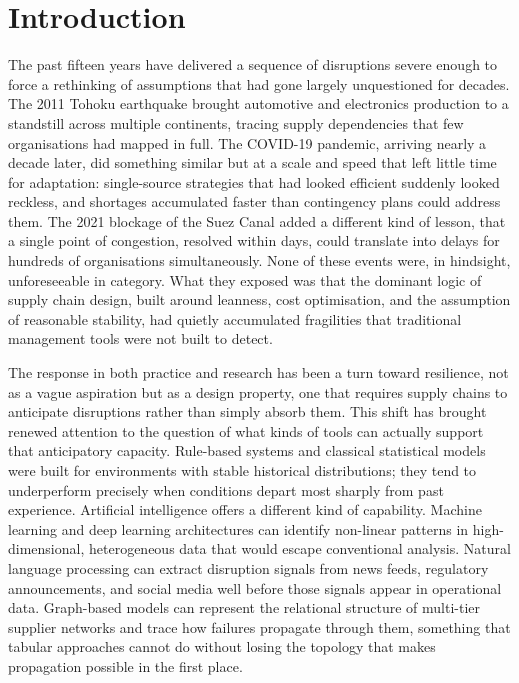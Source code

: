 \section{Introduction}

The past fifteen years have delivered a sequence of disruptions severe enough
to force a rethinking of assumptions that had gone largely unquestioned for
decades. The 2011 Tohoku earthquake brought automotive and electronics
production to a standstill across multiple continents, tracing supply
dependencies that few organisations had mapped in full. The COVID-19
pandemic, arriving nearly a decade later, did something similar but at a
scale and speed that left little time for adaptation: single-source strategies
that had looked efficient suddenly looked reckless, and shortages accumulated
faster than contingency plans could address them. The 2021 blockage of the
Suez Canal added a different kind of lesson, that a single point of
congestion, resolved within days, could translate into delays for hundreds of
organisations simultaneously. None of these events were, in hindsight,
unforeseeable in category. What they exposed was that the dominant logic of
supply chain design, built around leanness, cost optimisation, and the
assumption of reasonable stability, had quietly accumulated fragilities that
traditional management tools were not built to detect.

The response in both practice and research has been a turn toward
resilience, not as a vague aspiration but as a design property, one that
requires supply chains to anticipate disruptions rather than simply absorb
them. This shift has brought renewed attention to the question of what kinds
of tools can actually support that anticipatory capacity. Rule-based systems
and classical statistical models were built for environments with stable
historical distributions; they tend to underperform precisely when conditions
depart most sharply from past experience. Artificial intelligence offers a
different kind of capability. Machine learning and deep learning architectures
can identify non-linear patterns in high-dimensional, heterogeneous data that
would escape conventional analysis. Natural language processing can extract
disruption signals from news feeds, regulatory announcements, and social
media well before those signals appear in operational data. Graph-based models
can represent the relational structure of multi-tier supplier networks and
trace how failures propagate through them, something that tabular approaches
cannot do without losing the topology that makes propagation possible in the
first place.

